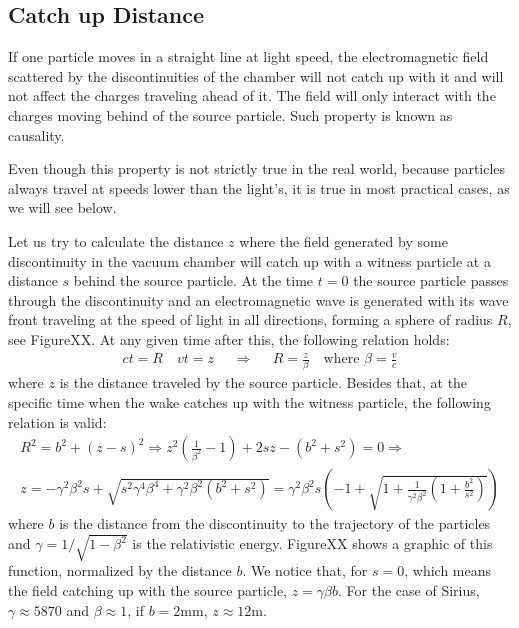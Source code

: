 \begin{apendicesenv}
\partapendices

\chapter{Catch up Distance}\label{app:catch_up}

    If one particle moves in a straight line at light speed, the electromagnetic field scattered by the discontinuities of the chamber will not catch up with it and will not affect the charges traveling ahead of it. The field will only interact with the charges moving behind of the source particle. Such property is known as causality.

    Even though this property is not strictly true in the real world, because particles always travel at speeds lower than the light's, it is true in most practical cases, as we will see below.

    Let us try to calculate the distance $z$ where the field generated by some discontinuity in the vacuum chamber will catch up with a witness particle at a distance $s$ behind the source particle. At the time $t=0$ the source particle passes through the discontinuity and an electromagnetic wave is generated with its wave front traveling at the speed of light in all directions, forming a sphere of radius $R$, see FigureXX. At any given time after this, the following relation holds:
    \begin{align}
		ct = R \quad vt = z && \Rightarrow && R = \frac{z}{\beta} \quad \text{where} \,\, \beta = \frac{v}{c}
    \end{align}
    where $z$ is the distance traveled by the source particle. Besides that, at the specific time when the wake catches up with the witness particle, the following relation is valid:
    \begin{align}
		R^2 = b^2 + (z-s)^2  \Rightarrow z^2(\frac{1}{\beta^2}-1) + 2sz - (b^2 + s^2) = 0  \Rightarrow \\
		z = -\gamma^2 \beta^2 s + \sqrt{s^2\gamma^4\beta^4 + \gamma^2\beta^2\left(b^2 + s^2\right)}  = \gamma^2 \beta^2 s\left(-1 + \sqrt{1 + \frac{1}{\gamma^2\beta^2}\left(1 + \frac{b^2}{s^2}\right)}\right)
    \end{align}
    where $b$ is the distance from the discontinuity to the trajectory of the particles and $\gamma = 1/\sqrt{1-\beta^2}$ is the relativistic energy. FigureXX shows a graphic of this function, normalized by the distance $b$. We notice that, for $s=0$, which means the field catching up with the source particle, $z = \gamma\beta b$. For the case of Sirius, $\gamma \approx 5870$ and $\beta \approx 1$, if $ b = 2$mm, $z \approx 12$m.


\end{apendicesenv}
